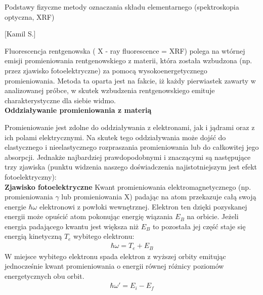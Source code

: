 \documentclass{article}
\begin{document}
\begin{enumerate}
{\Large \bf  \item Podstawy fizyczne metody oznaczania składu elementarnego (spektroskopia
optyczna, XRF)} [Kamil S.]



Fluorescencja rentgenowska ( X - ray fluorescence = XRF) polega na wtórnej emisji promieniowania rentgenowskiego z materii, która została wzbudzona (np. przez zjawisko fotoelektryczne) za pomocą wysokoenergetycznego promieniowania. Metoda ta oparta jest na fakcie, iż każdy pierwiastek zawarty w analizowanej próbce, w skutek wzbudzenia rentgenowskiego emituje charakterystyczne dla siebie widmo.\\

{\bf Oddziaływanie promieniowania z materią}

Promieniowanie jest zdolne do oddziaływania z elektronami, jak i jądrami oraz z ich polami elektrycznymi. Na skutek tego oddziaływania może dojść do elastycznego i nieelastycznego rozpraszania promieniowania lub do całkowitej jego absorpcji. Jednakże najbardziej prawdopodobnymi i znaczącymi są następujące trzy zjawiska (punktu widzenia naszego doświadczenia najistotniejszym jest efekt fotoelektryczny):\\

{\bf Zjawisko fotoelektryczne}
Kwant promieniowania elektromagnetycznego (np. promieniowania $\gamma$ lub promieniowania X) padając na atom przekazuje całą swoją energie $\hbar\omega$ elektronowi z powłoki wewnętrznej. Elektron ten dzięki pozyskanej energii może opuścić atom pokonując energię wiązania $E_B$ na orbicie. Jeżeli energia padającego kwantu jest większa niż $E_B$ to pozostała jej część staje się energią kinetyczną $T_e$ wybitego elektronu:
\begin{gather*}
\hbar\omega=T_e+E_B
\end{gather*}
W miejsce wybitego elektronu spada elektron z wyższej orbity emitując jednocześnie kwant promieniowania o energii równej różnicy poziomów energetycznych obu orbit.
\begin{gather*}
\hbar\omega'=E_i-E_f
\end{gather*}


\end{enumerate}
\end{document}
